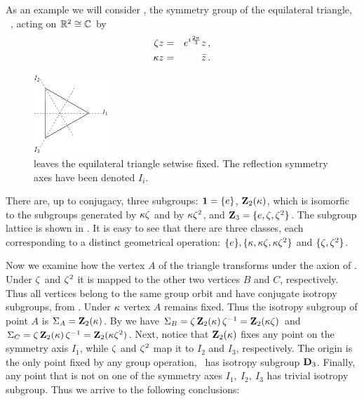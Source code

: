 \begin{example}
As an example we will consider , the symmetry group of the equilateral triangle, \cf~, acting on $\mathbb{R}^{2}\cong\mathbb{C}^{}$ by
\begin{eqnarray*}
  \zeta z &=& e^{i\frac{2\pi}{3}} z\,,\\
  \kappa z  &=& \bar{z}\,.
\end{eqnarray*}

\begin{figure}
\begin{center}
		\includegraphics[width=0.25\textwidth]{../figs/D3triangle}
\end{center}
\caption[D3 symmetry illustration.]{
    {\small
     leaves the equilateral triangle setwise fixed. The reflection symmetry axes have been denoted $I_i$.}}
\label{fig:D3triangle}
    \vspace*{-5pt}
\end{figure}

There are, up to conjugacy, three subgroups: $\mathbf{1}=\{e\}$, $\mathbf{Z}_2(\kappa)$, which is isomorfic to the subgroups generated 
by $\kappa\zeta$ and by $\kappa\zeta^2$, and $\mathbf{Z}_3=\{e,\zeta,\zeta^2\}$. The subgroup lattice is shown in .
It is easy to see that there are three classes, each corresponding to a distinct geometrical operation: $\{e\},\{\kappa,\kappa\zeta,\kappa\zeta^2\}$ 
and $\{\zeta,\zeta^2\}$.

Now we examine how the vertex $A$ of the triangle transforms under the axion of . Under $\zeta$ and $\zeta^2$ it is mapped
to the other two vertices $B$ and $C$, respectively. Thus all vertices belong to the same group orbit and have conjugate isotropy subgroups, from . Under $\kappa$ vertex $A$ remains fixed. Thus the isotropy subgroup of point $A$ is $\Sigma_{A}=\mathbf{Z}_2(\kappa)$. By
 we have $\Sigma_{B}=\zeta\, \mathbf{Z}_2(\kappa)\, \zeta^{-1} = \mathbf{Z}_2(\kappa\zeta)$ and $\Sigma_{C}=\zeta\, \mathbf{Z}_2(\kappa)\, \zeta^{-1} 
= \mathbf{Z}_2(\kappa\zeta^2)$. Next, notice that $\mathbf{Z}_2(\kappa)$ fixes any point on the symmetry axis $I_1$, while $\zeta$ and $\zeta^2$ map it to $I_2$
and $I_3$, respectively. The origin is the only point fixed by any group operation, \ie~has isotropy subgroup $\mathbf{D}_3$. Finally,
any point that is not on one of the symmetry axes $I_1,\ I_2,\ I_3$ has trivial isotropy subgroup. Thus we arrive to the following conclusions:


\end{example}
